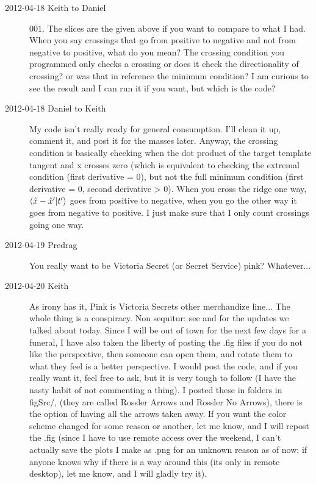 \begin{description}
\item[2012-04-18 Keith to Daniel] $\overline{001}$.  The slices are the
given above if you want to compare to what I had.  When you say crossings
that go from positive to negative and not from negative to positive, what
do you mean?  The crossing condition you programmed only checks a
crossing or does it check the directionality of crossing?  or was that in
reference the minimum condition? I am curious to see the result and I can
run it if you want, but which is the code?

\item[2012-04-18 Daniel to Keith] My code isn't really ready for general
consumption. I'll clean it up, comment it, and post it for the masses
later. Anyway, the crossing condition is basically checking when the dot
product of the target template tangent and x crosses zero (which is
equivalent to checking the extremal condition (first derivative = 0), but
not the full minimum condition (first derivative = 0, second derivative >
0). When you cross the ridge one way, $\braket{\sspRed -
\slicep}{\sliceTan{}}$ goes from positive to negative, when you go the
other way it goes from negative to positive. I just make sure that I only
count crossings going one way.

\item[2012-04-19 Predrag] You really want  to be
Victoria Secret (or Secret Service) pink? Whatever...

\item[2012-04-20 Keith] As irony has it, Pink is Victoria Secrets other
merchandize line... The whole thing is a conspiracy. Non sequitur: see
 and  for the updates we
talked about today.  Since I will be out of town for the next few days
for a funeral, I have also taken the liberty of posting the .fig files if
you do not like the perspective, then someone can open them, and rotate
them to what they feel is a better perspective.  I would post the code,
and if you really want it, feel free to ask, but it is very tough to
follow (I have the nasty habit of not commenting a thing).  I posted
these in folders in figSrc/, (they are called Rossler Arrows and Rossler
No Arrows), there is the option of having all the arrows taken away.  If
you want the color scheme changed for some reason or another, let me
know, and I will repost the .fig (since I have to use remote access over
the weekend, I can't actually save the plots I make as .png for an
unknown reason as of now; if anyone knows why if there is a way around
this (its only in remote desktop), let me know, and I will gladly try
it).


\end{description}
